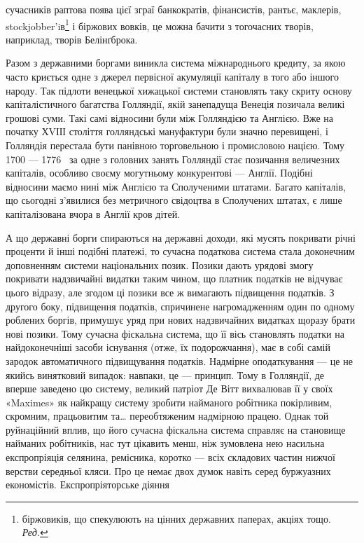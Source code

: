 \parcont{}  %
сучасників раптова поява цієї зграї банкократів, фінансистів, рантьє, маклерів,
stockjobber’iв\footnote*{
біржовиків, що спекулюють на цінних державних паперах, акціях тощо. \emph{Ред.}
} і
біржових вовків, це можна бачити з тогочасних творів, наприклад, творів Белінґброка.

Разом з державними боргами виникла система міжнароднього кредиту, за якою часто криється одне з
джерел первісної акумуляції капіталу в того або іншого народу. Так підлоти венецької хижацької
системи становлять таку скриту основу капіталістичного
багатства Голляндії, якій занепадуща Венеція позичала великі грошові суми. Такі самі відносини були
між Голляндією та Англією. Вже на початку ХVІІІ століття голляндські мануфактури були значно
перевищені, і Голляндія перестала бути панівною торговельною і промисловою нацією. Тому 1700 — 1776~ за одне з головних занять Голляндії стає позичання величезних капіталів, особливо своєму
могутньому конкурентові — Англії. Подібні відносини маємо нині між Англією та Сполученими
штатами. Багато капіталів, що сьогодні з’явилися без метричного свідоцтва в Сполучених штатах, є
лише капіталізована вчора в Англії кров дітей.

А що державні борги спираються на державні доходи, які мусять покривати річні проценти й інші
подібні платежі, то сучасна податкова система стала доконечним доповненням системи національних
позик. Позики дають урядові змогу покривати
надзвичайні видатки таким чином, що платник податків не відчуває цього відразу, але згодом ці позики
все ж вимагають підвищення податків. З другого боку, підвищення податків, спричинене нагромадженням
один по одному роблених боргів, примушує
уряд при нових надзвичайних видатках щоразу брати нові позики. Тому сучасна фіскальна система, що її
вісь становлять податки на найдоконечніші засоби існування (отже, їх подорожчання), має в собі самій
зародок автоматичного підвищування податків. Надмірне оподаткування — це не якийсь винятковий
випадок: навпаки, це — принцип. Тому в Голляндії, де вперше заведено цю систему, великий патріот Де
Вітт вихвалював її у своїх «Maximes» як найкращу систему зробити найманого робітника покірливим,
скромним, працьовитим та\dots{} переобтяженим надмірною працею. Однак той руйнаційний вплив, що його
сучасна фіскальна система справляє на становище найманих робітників, нас тут цікавить менш, ніж
зумовлена нею насильна експропріяція селянина, ремісника, коротко — всіх складових частин нижчої
верстви середньої кляси. Про це немає двох думок навіть серед буржуазних економістів.
Експропріяторське діяння
\parbreak{}  %
